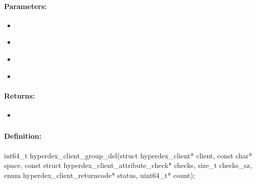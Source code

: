 \paragraph{Parameters:}
\begin{itemize}[noitemsep]
\item {}\\

\item {}\\

\item {}\\

\item {}\\

\end{itemize}

\paragraph{Returns:}
\begin{itemize}[noitemsep]
\item {}\\

\end{itemize}

\pagebreak
\subsubsection{}
\label{api:c:group_del}


\paragraph{Definition:}
\begin{ccode}
int64_t hyperdex_client_group_del(struct hyperdex_client* client,
        const char* space,
        const struct hyperdex_client_attribute_check* checks, size_t checks_sz,
        enum hyperdex_client_returncode* status,
        uint64_t* count);
\end{ccode}

